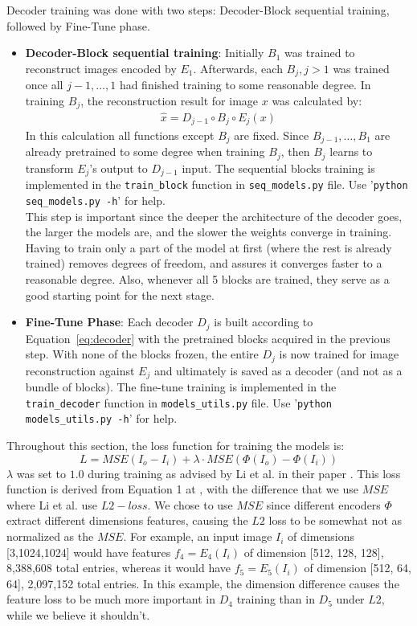 Decoder training was done with two steps: Decoder-Block sequential training, followed by Fine-Tune phase.
\begin{itemize}
	\item \textbf{Decoder-Block sequential training}: Initially $B_1$ was trained to reconstruct images encoded by $E_1$. Afterwards, each $B_j, j>1$ was trained once all $j-1,\dots,1$ had finished training to some reasonable degree. In training $B_j$, the reconstruction result for image $x$ was calculated by:
	\begin{gather*}
	\hat{x} = D_{j-1} \circ B_j \circ E_j (x)
	\end{gather*}
	In this calculation all functions except $B_j$ are fixed. Since $B_{j-1}, \dots, B_1$ are already pretrained to some degree when training $B_j$, then $B_j$ learns to transform $E_j$'s output to $D_{j-1}$ input. The sequential blocks training is implemented in the \texttt{train\_block} function in \texttt{seq\_models.py} file. Use '\texttt{python seq\_models.py -h}' for help.\\
	This step is important since the deeper the architecture of the decoder goes, the larger the models are, and the slower the weights converge in training. Having to train only a part of the model at first (where the rest is already trained) removes degrees of freedom, and assures it converges faster to a reasonable degree. Also, whenever all 5 blocks are trained, they serve as a good starting point for the next stage.

	\item \textbf{Fine-Tune Phase}: Each decoder $D_j$ is built according to Equation~\ref*{eq:decoder} with the pretrained blocks acquired in the previous step. With none of the blocks frozen, the entire $D_j$ is now trained for image reconstruction against $E_j$ and ultimately is saved as a decoder (and not as a bundle of blocks). The fine-tune training is implemented in the \texttt{train\_decoder} function in \texttt{models\_utils.py} file. Use '\texttt{python models\_utils.py -h}' for help.
\end{itemize}

Throughout this section, the loss function for training the models is:
\begin{equation}\label{eq:loss}
L = MSE(I_o-I_i) + \lambda \cdot MSE(\Phi(I_o)-\Phi(I_i))
\end{equation}
$\lambda$ was set to $1.0$ during training as advised by Li et al. in their paper \cite{bib11}. This loss function is derived from Equation 1 at \cite{bib11}, with the difference that we use $MSE$ where Li et al. use $L2 -loss$. We chose to use $MSE$ since different encoders $\Phi$ extract different dimensions features, causing the $L2$ loss to be somewhat not as normalized as the $MSE$. For example, an input image $I_i$ of dimensions [3,1024,1024] would have features $f_4=E_4(I_i)$ of dimension [512, 128, 128], 8,388,608 total entries, whereas it would have $f_5=E_5(I_i)$ of dimension [512, 64, 64], 2,097,152 total entries. In this example, the dimension difference causes the feature loss to be much more important in $D_4$ training than in $D_5$ under $L2$, while we believe it shouldn't.\\

